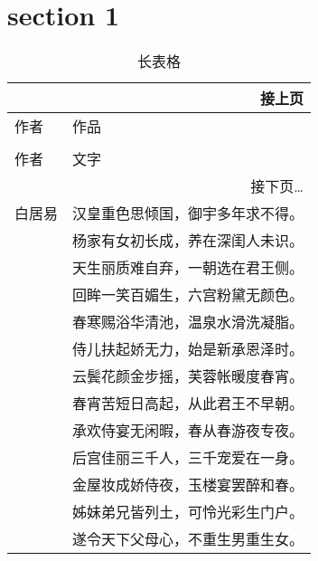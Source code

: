 \documentclass[12pt]{article}
\begin{document}
    \section{section 1}
        \begin{longtable}{ll}
            \multicolumn{2}{r}{接上页} \\  %
            \toprule
            作者 & 作品 \\
            \midrule
            \endhead
            \caption{长表格} \\    %
            \toprule
            作者 & 文字 \\
            \midrule
            \endfirsthead
            \bottomrule
            \multicolumn{2}{r}{接下页\dots} \\     %
            \endfoot
            \bottomrule
            \endlastfoot
            白居易 & 汉皇重色思倾国，御宇多年求不得。 \\
            & 杨家有女初长成，养在深闺人未识。 \\
            & 天生丽质难自弃，一朝选在君王侧。 \\
            & 回眸一笑百媚生，六宫粉黛无颜色。 \\
            & 春寒赐浴华清池，温泉水滑洗凝脂。 \\
            & 侍儿扶起娇无力，始是新承恩泽时。 \\
            & 云鬓花颜金步摇，芙蓉帐暖度春宵。 \\
            & 春宵苦短日高起，从此君王不早朝。 \\
            & 承欢侍宴无闲暇，春从春游夜专夜。 \\
            & 后宫佳丽三千人，三千宠爱在一身。 \\
            & 金屋妆成娇侍夜，玉楼宴罢醉和春。 \\
            & 姊妹弟兄皆列土，可怜光彩生门户。 \\
            & 遂令天下父母心，不重生男重生女。 \\

\end{longtable}
\end{document}
